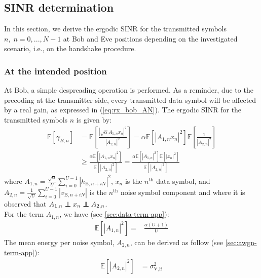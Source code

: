 \documentclass[journal,comsoc]{IEEEtran}
\newcommand{\EX}[1]{\mathbb{E} \left[#1\right]}%
\newcommand\independent{\protect\mathpalette{\protect\independenT}{\perp}}
\def\independenT#1#2{\mathrel{\rlap{$#1#2$}\mkern2mu{#1#2}}}
\begin{document}

\subsection{SINR determination}
In this section, we derive the ergodic SINR for the transmitted symbols $n, \; n = 0,...,N-1$ at Bob and Eve positions depending on the investigated scenario, i.e., on the handshake procedure. 



\subsubsection{At the intended position}
At Bob, a simple despreading operation is performed. As a reminder, due to the precoding at the transmitter side, every transmitted data symbol will be affected by a real gain, as expressed in (\ref{eq:rx_bob_AN}). The ergodic SINR for the transmitted symbols $n$ is given by:
\begin{equation}
\begin{split}
\EX{\gamma_{B,n}} &= \EX{ \frac{  \left| \sqrt{\alpha} A_{1,n} x_n \right|^2  }{  \left| A_{2,n} \right|^2} }  = \alpha \EX{\left| A_{1,n}  x_n\right|^2}  \EX{\frac{1}{\left| A_{2,n} \right|^2}}  \\
& \geq  \frac{\alpha \EX{  \left| A_{1,n}  x_n\right|^2 } }{\EX{ \left| A_{2,n} \right|^2 }} =  \frac{\alpha \EX{ \left| A_{1,n}  \right|^2 } \EX{ \left| x_n \right|^2 } }{\EX{ \left| A_{2,n} \right|^2 }}
\label{eq:RV_sinr_b}
\end{split}
\end{equation}
where $A_{1,n} = \frac{\sqrt{\alpha}}{U}\sum_{i=0}^{U-1} \left| h_{\text{B}, n + iN}\right|^2$, $x_n$ is the $n^{\text{th}}$ data symbol, and $A_{2,n} = \frac{1}{\sqrt{U}}\sum_{i=0}^{U-1} \left| v_{\text{B}, n + iN}\right|$ is the $n^{\text{th}}$ noise symbol component and where it is observed that $A_{1,n} \independent x_n \independent A_{2,n}$.\\
For the term $A_{1,n}$, we have (see \ref{sec:data-term-app}):
\begin{equation}
	\begin{split}
	\EX{|A_{1,n}|^2} =& \frac{\alpha (U+1)}{U}
	\end{split}
	\label{eq:appA:data_bob}
\end{equation}
The mean energy per noise symbol, $A_{2,n}$, can be derived as follow (see \ref{sec:awgn-term-app}):
\begin{equation}
	\begin{split}
	\EX{|A_{2,n}|^2} &= \sigma^2_{\text{V,B}}
	\end{split}
	\label{eq:appA:noise_bob}
\end{equation}
\end{document}
